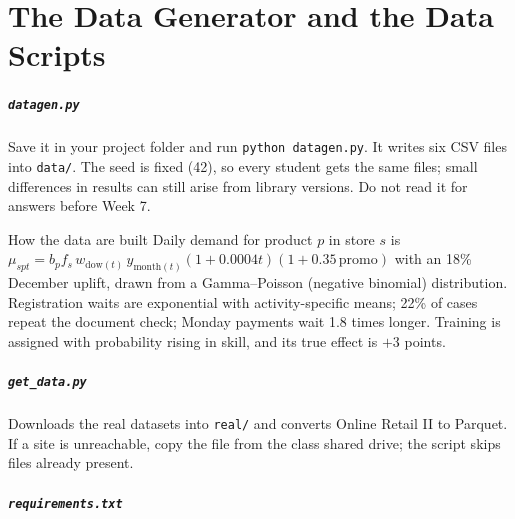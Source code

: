 \appendix
\renewcommand{\chaplabel}{APPENDIX}

\chapter{The Data Generator and the Data Scripts}
\paragraph{\texttt{datagen.py}} Save it in your project folder and run \texttt{python datagen.py}. It writes six CSV
files into \texttt{data/}. The seed is fixed (42), so every student gets the same files; small differences in results
can still arise from library versions. Do not read it for answers before Week 7.


\begin{insight}{How the data are built}
Daily demand for product $p$ in store $s$ is
$\mu_{spt}=b_p f_s\, w_{\text{dow}(t)}\, y_{\text{month}(t)}(1+0.0004t)(1+0.35\,\text{promo})$ with an 18\% December uplift,
drawn from a Gamma--Poisson (negative binomial) distribution. Registration waits are exponential with
activity-specific means; 22\% of cases repeat the document check; Monday payments wait 1.8 times longer. Training
is assigned with probability rising in skill, and its true effect is $+3$ points.
\end{insight}

\paragraph{\texttt{get\_data.py}} Downloads the real datasets into \texttt{real/} and converts Online Retail II to
Parquet. If a site is unreachable, copy the file from the class shared drive; the script skips files already present.


\paragraph{\texttt{requirements.txt}}


